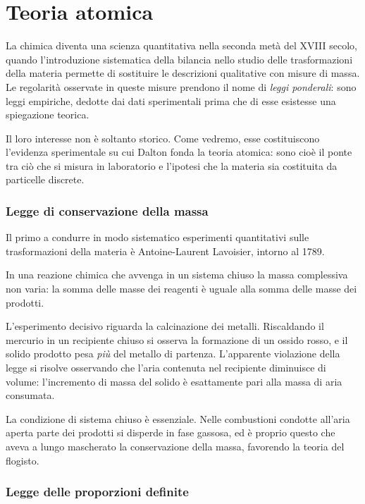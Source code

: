 \chapter{Teoria atomica}

La chimica diventa una scienza quantitativa nella seconda metà del XVIII secolo, quando l'introduzione sistematica della bilancia nello studio delle trasformazioni della materia permette di sostituire le descrizioni qualitative con misure di massa. 
Le regolarità osservate in queste misure prendono il nome di \emph{leggi ponderali}: sono leggi empiriche, dedotte dai dati sperimentali prima che di esse esistesse una spiegazione teorica.
 
Il loro interesse non è soltanto storico. Come vedremo, esse costituiscono l'evidenza sperimentale su cui Dalton fonda la teoria atomica: sono cioè il ponte tra ciò che si misura in laboratorio e l'ipotesi che la materia sia costituita da particelle discrete.
 
\subsection{Legge di conservazione della massa}
 
Il primo a condurre in modo sistematico esperimenti quantitativi sulle trasformazioni della materia è Antoine-Laurent Lavoisier, intorno al 1789.
 
\begin{definizione}
    In una reazione chimica che avvenga in un sistema chiuso la massa  complessiva non varia: la somma delle masse dei reagenti è uguale alla somma delle masse dei prodotti.
\end{definizione}
 
L'esperimento decisivo riguarda la calcinazione dei metalli. Riscaldando il mercurio in un recipiente chiuso si osserva la formazione di un ossido rosso, e il solido prodotto pesa \emph{più} del metallo di partenza. 
L'apparente violazione della legge si risolve osservando che l'aria contenuta nel recipiente diminuisce di volume: l'incremento di massa del solido è esattamente pari alla massa di aria consumata.
 
La condizione di sistema chiuso è essenziale. Nelle combustioni condotte all'aria aperta parte dei prodotti si disperde in fase gassosa, ed è proprio questo che aveva a lungo mascherato la conservazione della massa, favorendo la teoria del flogisto.
 
\subsection{Legge delle proporzioni definite}
 

